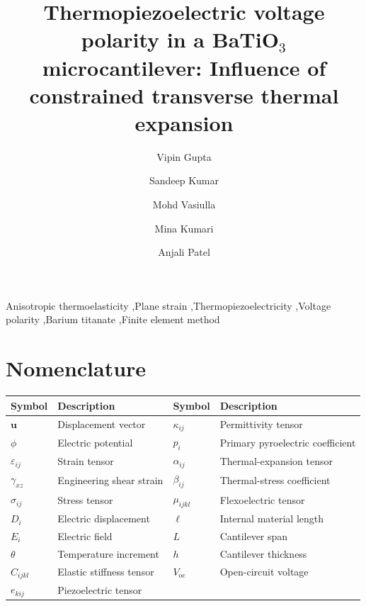 \documentclass[a4paper,12pt]{elsarticle}
\begin{document}
\begin{frontmatter}
\title{Thermopiezoelectric voltage polarity in a BaTiO$_3$ microcantilever: Influence of constrained transverse thermal expansion}
\author[aff1]{Vipin Gupta}
\author[aff2]{Sandeep Kumar}
\author[aff3]{Mohd Vasiulla}
\author[aff4]{Mina Kumari}
\author[aff5]{Anjali Patel}
\def\FINELManuscriptMode{}

\begin{keyword}
Anisotropic thermoelasticity \sep Plane strain \sep Thermopiezoelectricity \sep Voltage polarity \sep Barium titanate \sep Finite element method
\end{keyword}
\end{frontmatter}
\section*{Nomenclature}
\begingroup
\small
\setlength{\tabcolsep}{3pt}
\noindent\begin{tabularx}{\linewidth}{@{}l>{\raggedright\arraybackslash}Xl>{\raggedright\arraybackslash}X@{}}
\toprule
\textbf{Symbol} & \textbf{Description} & \textbf{Symbol} & \textbf{Description}\\
\midrule
$\bm u$ & Displacement vector & $\kappa_{ij}$ & Permittivity tensor\\
$\phi$ & Electric potential & $p_i$ & Primary pyroelectric coefficient\\
$\varepsilon_{ij}$ & Strain tensor & $\alpha_{ij}$ & Thermal-expansion tensor\\
$\gamma_{xz}$ & Engineering shear strain & $\beta_{ij}$ & Thermal-stress coefficient\\
$\sigma_{ij}$ & Stress tensor & $\mu_{ijkl}$ & Flexoelectric tensor\\
$D_i$ & Electric displacement & $\ell$ & Internal material length\\
$E_i$ & Electric field & $L$ & Cantilever span\\
$\theta$ & Temperature increment & $h$ & Cantilever thickness\\
$C_{ijkl}$ & Elastic stiffness tensor & $V_{\mathrm{oc}}$ & Open-circuit voltage\\
$e_{kij}$ & Piezoelectric tensor & &\\
\bottomrule
\end{tabularx}
\endgroup
\end{document}
